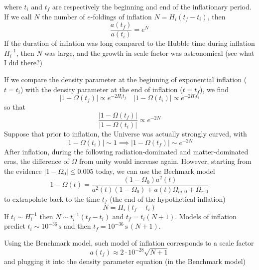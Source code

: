 where $t_{i}$ and $t_{f}$ are respectively the beginning and end of the inflationary period. If we call $N$ the number of $e$-foldings of inflation $N = H_{i}(t_{f}-t_{i})$, then
\begin{equation*}
    \frac{a(t_{f})}{a(t_{i})} = e^{N}
\end{equation*}
If the duration of inflation was long compared to the Hubble time during inflation $H_{i}^{-1}$, then $N$ was large, and the growth in scale factor was astronomical (see what I did there?)
\par If we compare the density parameter at the beginning of exponential inflation ($t = t_{i}$) with the density parameter at the end of inflation ($t = t_{f}$), we find
\begin{equation*}
     | 1-\Omega(t_{f})| \propto e^{-2H_{i}t_{f}} \quad  | 1-\Omega(t_{i})| \propto e^{-2H_{i}t_{i}}
\end{equation*}
so that 
\begin{equation*}
    \frac{| 1-\Omega(t_{f})|}{| 1-\Omega(t_{i})|} \propto e^{-2N}
\end{equation*}
Suppose that prior to inflation, the Universe was actually strongly curved, with
\begin{equation*}
    |1-\Omega(t_{i})|\sim 1 \implies  |1-\Omega(t_{f})|\sim e^{-2N}
\end{equation*}
After inflation, during the following radiation-dominated and matter-dominated eras, the difference of $\Omega$ from unity would increase again. However, starting from the evidence $|1-\Omega_{0}|\leq 0.005$ today, we can use the Bechmark model
\begin{equation*}
    1-\Omega(t) = \frac{(1-\Omega_{0})a^{2}(t)}{a^{2}(t)(1-\Omega_{0})+a(t)\Omega_{m,0}+\Omega_{r,0}}
\end{equation*}
to extrapolate back to the time $t_{f}$ (the end of the hypothetical inflation)
\begin{equation*}
    N = H_{i}(t_{f}-t_{i})
\end{equation*}
If $t_{i}\sim H_{i}^{-1}$ then $N\sim t_{i}^{-1}(t_{f}-t_{i})$ and $t_{f} = t_{i}(N+1)$. Models of inflation predict $t_{i}\sim 10^{-36}\,\text{s}$ and then $t_{f} = 10^{-36}\,\text{s}\,(N+1)$.
\par Using the Benchmark model, such model of inflation corresponds to a scale factor 
\begin{equation*}
    a(t_{f})\approx 2\cdot 10^{-28}\sqrt{N+1}
\end{equation*}
and plugging it into the density parameter equation (in the Benchmark model)
